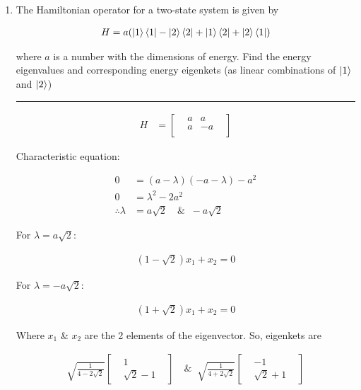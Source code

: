 \documentclass[12pt, oneside]{article}
\newenvironment{answer}
  {\vspace*{0.2cm} \rule{12cm}{0.02cm} \vspace*{0.2cm}}
  {\vspace*{0.2cm}}
\begin{document}
\begin{enumerate}
    \item The Hamiltonian operator for a two-state system is given by

    \begin{align*}
      H = a(\ket{1}\bra{1} - \ket{2}\bra{2} + \ket{1}\bra{2} + \ket{2}\bra{1})
    \end{align*}

    where $a$ is a number with the dimensions of energy. Find the energy eigenvalues and corresponding energy eigenkets (as linear combinations of $\ket{1}$ and $\ket{2}$)

    \begin{answer}
      \begin{align*}
        H &= \begin{bmatrix}
                & a & a  & \\
                & a & -a & \\
              \end{bmatrix}
      \end{align*}

      Characteristic equation:

      \begin{align*}
        0 &= (a - \lambda)(-a - \lambda) - a^2\\
        0 &= \lambda^2 - 2a^2 \\
        \therefore \lambda &= a\sqrt{2} \quad \& \; \; -a\sqrt{2}
      \end{align*}

      For $\lambda = a\sqrt{2}:$

      \begin{align*}
        (1 - \sqrt{2})x_1 + x_2 = 0
      \end{align*}

      For $\lambda = -a\sqrt{2}:$

      \begin{align*}
        (1 + \sqrt{2})x_1 + x_2 = 0
      \end{align*}

      Where $x_1$ \& $x_2$ are the 2 elements of the eigenvector. So, eigenkets are

      \begin{align*}
        \sqrt{\frac{1}{4-2\sqrt{2}}}\begin{bmatrix}
                                   & 1 &\\
                                   & \sqrt{2} - 1
                                   \end{bmatrix}
                                   \quad \& \; \;
         \sqrt{\frac{1}{4+2\sqrt{2}}}\begin{bmatrix}
                                    & -1 &\\
                                    & \sqrt{2} + 1
                                    \end{bmatrix}
      \end{align*}


\end{answer}
\end{enumerate}
\end{document}
